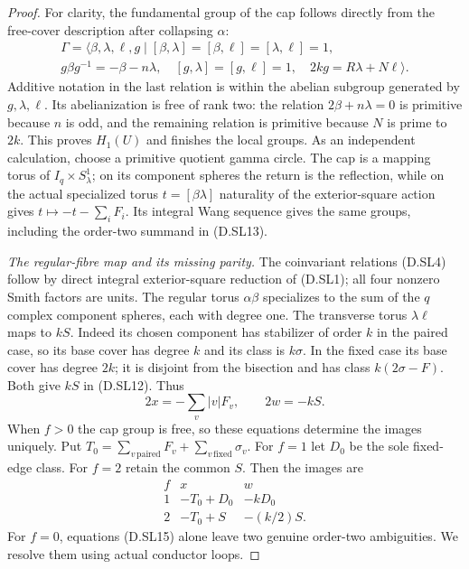 \begin{proof}
For clarity, the fundamental group of the
cap follows directly from the free-cover
description after collapsing $\alpha$:
\[
\begin{gathered}
 \Gamma=\langle\beta,\lambda,\ell,g\mid
 [\beta,\lambda]=[\beta,\ell]=[\lambda,\ell]=1,\\
 g\beta g^{-1}=-\beta-n\lambda,\quad
 [g,\lambda]=[g,\ell]=1,\quad
                    2kg=R\lambda+N\ell\rangle .
\end{gathered}                                             \tag{D.SL14}
\]
Additive notation in the last relation is
within the abelian subgroup generated by
$g,\lambda,\ell$. Its abelianization is free
of rank two: the relation $2\beta+n\lambda=0$
is primitive because $n$ is odd, and the
remaining relation is primitive because
$N$ is prime to $2k$. This proves $H_1(U)$
and finishes the local groups. As an
independent calculation, choose a primitive
quotient gamma circle. The cap is a mapping
torus of $I_q\times S^1_\lambda$; on its
component spheres the return is the
reflection, while on the actual specialized
torus $t=[\beta\lambda]$ naturality of the
exterior-square action gives
$t\mapsto-t-\sum_iF_i$. Its integral Wang
sequence gives the same groups, including
the order-two summand in (D.SL13).

\emph{The regular-fibre map and its missing parity.}
The coinvariant relations (D.SL4) follow
by direct integral exterior-square reduction
of (D.SL1); all four nonzero Smith factors
are units. The regular torus $\alpha\beta$
specializes to the sum of the $q$ complex
component spheres, each with degree one.
The transverse torus $\lambda\ell$ maps
to $kS$. Indeed its chosen component has
stabilizer of order $k$ in the paired case,
so its base cover has degree $k$ and its
class is $k\sigma$. In the fixed case its
base cover has degree $2k$; it is disjoint
from the bisection and has class
$k(2\sigma-F)$. Both give $kS$ in (D.SL12).
Thus
\[
        2x=-\sum_v|v|F_v,\qquad 2w=-kS.                  \tag{D.SL15}
\]
When $f>0$ the cap group is free, so these
equations determine the images uniquely.
Put
$T_0=\sum_{v\,\mathrm{paired}}F_v+
       \sum_{v\,\mathrm{fixed}}\sigma_v$.
For $f=1$ let $D_0$ be the sole fixed-edge
class. For $f=2$ retain the common $S$.
Then the images are
\[
\begin{array}{c|c|c}
 f&x&w\\\hline
1&-T_0+D_0&-kD_0\\
2&-T_0+S&-(k/2)S.
\end{array}                                               \tag{D.SL16}
\]
For $f=0$, equations (D.SL15) alone leave
two genuine order-two ambiguities. We
resolve them using actual conductor loops.


\end{proof}
